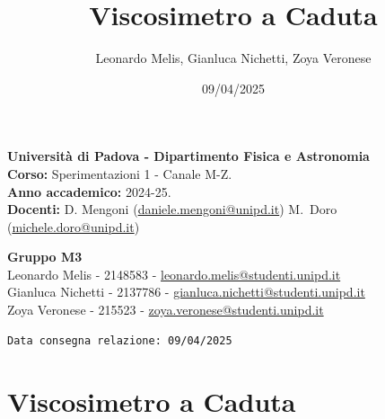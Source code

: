 \documentclass{article}
\title {Viscosimetro a Caduta}
\author{Leonardo Melis, Gianluca Nichetti, Zoya Veronese}
\date{09/04/2025}
\begin{document}
\hrulefill
\begin{flushright}
\textbf{Universit\`a di Padova - Dipartimento Fisica e Astronomia}\\ 
\textbf{Corso:} Sperimentazioni 1 - Canale M-Z.\\
\textbf{Anno accademico:} 2024-25.\\
\textbf{Docenti:} D. Mengoni (\url{daniele.mengoni@unipd.it}) M.~Doro (\url{michele.doro@unipd.it}) \\
\end{flushright}

\bigskip
\noindent

\large{\textbf{Gruppo M3} \\
Leonardo Melis - 2148583 - \url{leonardo.melis@studenti.unipd.it} \\
Gianluca Nichetti - 2137786 - \url{gianluca.nichetti@studenti.unipd.it} \\
Zoya Veronese - 215523 - \url{zoya.veronese@studenti.unipd.it} \\
\begin{verbatim}Data consegna relazione: 09/04/2025\end{verbatim} \hrulefill 

\section*{Viscosimetro a Caduta} }
\end{document}
